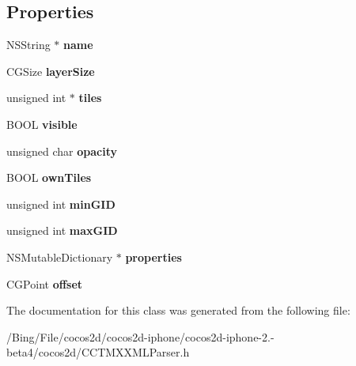 \subsection*{Properties}
\begin{DoxyCompactItemize}
\item 
\hypertarget{interface_c_c_t_m_x_layer_info_a0cec8edf834d9b4766ff7d65cc91c68e}{N\-S\-String $\ast$ {\bfseries name}}\label{interface_c_c_t_m_x_layer_info_a0cec8edf834d9b4766ff7d65cc91c68e}

\item 
\hypertarget{interface_c_c_t_m_x_layer_info_a3f6408394e7093496e9b190889d472ca}{C\-G\-Size {\bfseries layer\-Size}}\label{interface_c_c_t_m_x_layer_info_a3f6408394e7093496e9b190889d472ca}

\item 
\hypertarget{interface_c_c_t_m_x_layer_info_a6c0c02e342b24c0d7f0a16ee649b9a1f}{unsigned int $\ast$ {\bfseries tiles}}\label{interface_c_c_t_m_x_layer_info_a6c0c02e342b24c0d7f0a16ee649b9a1f}

\item 
\hypertarget{interface_c_c_t_m_x_layer_info_a0c8677afc8679e616bb34071fa391faa}{B\-O\-O\-L {\bfseries visible}}\label{interface_c_c_t_m_x_layer_info_a0c8677afc8679e616bb34071fa391faa}

\item 
\hypertarget{interface_c_c_t_m_x_layer_info_a81c9133b5e6e32d271466ecd3dc521cc}{unsigned char {\bfseries opacity}}\label{interface_c_c_t_m_x_layer_info_a81c9133b5e6e32d271466ecd3dc521cc}

\item 
\hypertarget{interface_c_c_t_m_x_layer_info_a6b29597c49cb77ce6b228c68e7c101fe}{B\-O\-O\-L {\bfseries own\-Tiles}}\label{interface_c_c_t_m_x_layer_info_a6b29597c49cb77ce6b228c68e7c101fe}

\item 
\hypertarget{interface_c_c_t_m_x_layer_info_a9ec24b920a702b4cad872ae3de0e658c}{unsigned int {\bfseries min\-G\-I\-D}}\label{interface_c_c_t_m_x_layer_info_a9ec24b920a702b4cad872ae3de0e658c}

\item 
\hypertarget{interface_c_c_t_m_x_layer_info_a77afb0ac6af552b07becbee1d9dbfa8b}{unsigned int {\bfseries max\-G\-I\-D}}\label{interface_c_c_t_m_x_layer_info_a77afb0ac6af552b07becbee1d9dbfa8b}

\item 
\hypertarget{interface_c_c_t_m_x_layer_info_a2af48ce12c4fffa0fabd10c8dd7b3c67}{N\-S\-Mutable\-Dictionary $\ast$ {\bfseries properties}}\label{interface_c_c_t_m_x_layer_info_a2af48ce12c4fffa0fabd10c8dd7b3c67}

\item 
\hypertarget{interface_c_c_t_m_x_layer_info_a664f40eb234b1d1d71388d3a9c6d2398}{C\-G\-Point {\bfseries offset}}\label{interface_c_c_t_m_x_layer_info_a664f40eb234b1d1d71388d3a9c6d2398}

\end{DoxyCompactItemize}


The documentation for this class was generated from the following file\-:\begin{DoxyCompactItemize}
\item 
/\-Bing/\-File/cocos2d/cocos2d-\/iphone/cocos2d-\/iphone-\/2.-\/beta4/cocos2d/C\-C\-T\-M\-X\-X\-M\-L\-Parser.\-h\end{DoxyCompactItemize}
